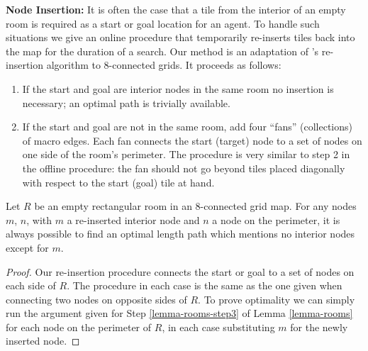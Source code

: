 \noindent
\textbf{Node Insertion:}
It is often the case that a tile from the interior of an empty room is required as a start or goal location for an
agent. 
To handle such situations we give an online procedure that temporarily re-inserts tiles back into the map for the duration
of a search. 
Our method is an adaptation of \citeauthor{harabor10}'s re-insertion algorithm to 8-connected grids.
It proceeds as follows:

\begin{enumerate}
\item{If the start and goal are interior nodes in the same room no insertion is necessary; an optimal
path is trivially available. }
\item{If the start and goal are not in the same room, add four ``fans'' (collections) of macro edges.
Each fan connects the start (target) node to a set of nodes on one side of the room's perimeter.
The procedure is very similar to step 2 in the offline procedure: the fan should not go beyond tiles
placed diagonally with respect to the start (goal) tile at hand.}
\end{enumerate}
\begin{lemma}
\label{lemma-insertion}
Let $R$ be an empty rectangular room in an 8-connected grid map.
For any nodes $m$, $n$, with $m$ a re-inserted interior node and $n$ a node on the perimeter, it is always possible to
find an optimal length path which mentions no interior nodes except for $m$.
\end{lemma}
\begin{proof}
Our re-insertion procedure connects the start or goal to a set of nodes on each side of $R$.
The procedure in each case is the same as the one given when connecting two nodes on opposite sides of $R$.
To prove optimality we can simply run the argument given for Step \ref{lemma-rooms-step3} of Lemma \ref{lemma-rooms} for each
node on the perimeter of $R$, in each case substituting $m$ for the newly inserted node.
\end{proof}

